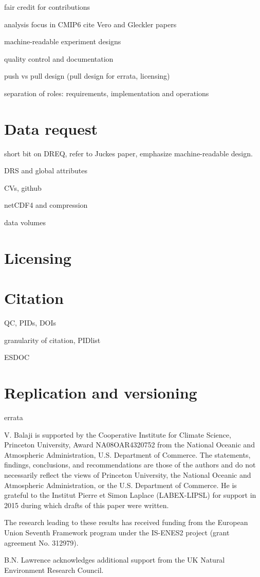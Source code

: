 \documentclass[gmd,manuscript]{copernicus}
\begin{document}
fair credit for contributions

analysis focus in CMIP6 cite Vero and Gleckler papers

machine-readable experiment designs

quality control and documentation

push vs pull design (pull design for errata, licensing)

separation of roles: requirements, implementation and operations

\section{Data request}
\label{sec:dreq}

short bit on DREQ, refer to Juckes paper, emphasize machine-readable design.

DRS and global attributes

CVs, github

netCDF4 and compression

data volumes

\section{Licensing}
\label{sec:licensing}

\section{Citation}
\label{sec:citation}

QC, PIDs, DOIs

granularity of citation, PIDlist

ESDOC

\section{Replication and versioning}
\label{sec:replication}

errata

\conclusions
\label{sec:summary}


\begin{acknowledgements}
  V. Balaji is supported by the Cooperative Institute for Climate
  Science, Princeton University, Award NA08OAR4320752 from the
  National Oceanic and Atmospheric Administration, U.S. Department of
  Commerce. The statements, findings, conclusions, and recommendations
  are those of the authors and do not necessarily reflect the views of
  Princeton University, the National Oceanic and Atmospheric
  Administration, or the U.S. Department of Commerce. He is grateful
  to the Institut Pierre et Simon Laplace (LABEX-LIPSL) for support in
  2015 during which drafts of this paper were written.

  The research leading to these results has received funding from the
  European Union Seventh Framework program under the IS-ENES2 project
  (grant agreement No. 312979).

  B.N. Lawrence acknowledges additional support from the UK Natural
  Environment Research Council.
\end{acknowledgements}



\end{document}
